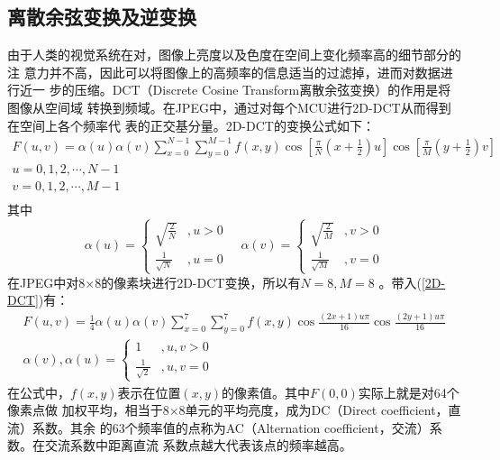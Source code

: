 \documentclass{article}
\numberwithin {equation}{section}
\begin{document}
\begin{spacing}{1.25}
  \subsection{离散余弦变换及逆变换}
    \vspace{1em}
    由于人类的视觉系统在对，图像上亮度以及色度在空间上变化频率高的细节部分的注
    意力并不高，因此可以将图像上的高频率的信息适当的过滤掉，进而对数据进行近一
    步的压缩。DCT（Discrete Cosine Transform离散余弦变换）的作用是将图像从空间域
    转换到频域。在JPEG中，通过对每个MCU进行2D-DCT从而得到在空间上各个频率代
    表的正交基分量。2D-DCT的变换公式如下：
    \begin{equation}
      \begin{gathered}
        F(u,v)=\alpha (u)\alpha (v) \sum_{x=0}^{N-1} \sum_{y=0}^{M-1}
        f(x,y)\cos \left[ \frac{\pi}{N}\left(x+\frac{1}{2}\right)u \right]
        \cos \left[ \frac{\pi}{M}\left(y+\frac{1}{2}\right)v \right]\\
        u=0,1,2,\cdots ,N-1 \\
        v=0,1,2,\cdots,M-1 \\
      \end{gathered}
      \label{2D-DCT}
    \end{equation}
    其中
    \begin{equation}
      \alpha (u) = \begin{cases}
        \sqrt{\frac{2}{N}} &,u>0\\
        \frac{1}{\sqrt{N}} &,u=0
      \end{cases}\quad
      \alpha (v) = \begin{cases}
        \sqrt{\frac{2}{M}} &,v>0\\
        \frac{1}{\sqrt{M}} &,v=0
      \end{cases}
    \end{equation}
    在JPEG中对8×8的像素块进行2D-DCT变换，所以有$N=8,M=8$ 。带入(\ref{2D-DCT})有：
    \begin{equation}
      \begin{gathered}
        F(u,v)=\frac{1}{4}\alpha (u)\alpha (v) \sum_{x=0}^{7} \sum_{y=0}^{7}
        f(x,y)\cos \frac{(2x+1)u\pi}{16}\cos \frac{(2y+1)u\pi}{16}\\
        \alpha (v),\alpha (u) = \begin{cases}
          1 &,u,v>0\\
          \frac{1}{\sqrt{2}} &,u,v=0
        \end{cases}
      \end{gathered}
      \label{8by8 2D-DCT}
    \end{equation}
    在公式中，$f(x,y)$表示在位置$(x,y)$的像素值。其中$F(0,0)$实际上就是对64个像素点做
    加权平均，相当于8×8单元的平均亮度，成为DC（Direct coefficient，直流）系数。其余
    的63个频率值的点称为AC（Alternation coefficient，交流）系数。在交流系数中距离直流
    系数点越大代表该点的频率越高。


\end{spacing}
\end{document}
